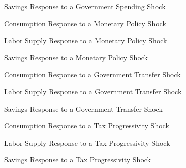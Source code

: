 \begin{figure}[ht]
    \centering
    \caption{Savings Response to a Government Spending Shock}
    
\end{figure}

\begin{figure}[ht]
    \centering
    \caption{Consumption Response to a Monetary Policy Shock}
    
\end{figure}

\begin{figure}[ht]
    \centering
    \caption{Labor Supply Response to a Monetary Policy Shock}
    
\end{figure}

\begin{figure}[ht]
    \centering
    \caption{Savings Response to a Monetary Policy Shock}
    
\end{figure}

\begin{figure}[ht]
    \centering
    \caption{Consumption Response to a Government Transfer Shock}
    
\end{figure}

\begin{figure}[ht]
    \centering
    \caption{Labor Supply Response to a Government Transfer Shock}
    
\end{figure}

\begin{figure}[ht]
    \centering
    \caption{Savings Response to a Government Transfer Shock}
    
\end{figure}

\begin{figure}[ht]
    \centering
    \caption{Consumption Response to a Tax Progressivity Shock}
    
\end{figure}

\begin{figure}[ht]
    \centering
    \caption{Labor Supply Response to a Tax Progressivity Shock}
    
\end{figure}

\begin{figure}[ht]
    \centering
    \caption{Savings Response to a Tax Progressivity Shock}
    
\end{figure}

